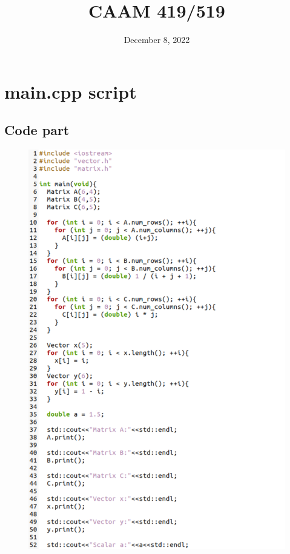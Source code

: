 \documentclass[10pt,a4paper]{article}
\title{CAAM 419/519}
\date{December 8, 2022}
\begin{document}
\maketitle

\section{main.cpp script}
\subsection{Code part}
\begin{figure}[!ht]
        \centering \includegraphics[scale=0.8]{figures/code1.png}
\end{figure}
\end{document}
